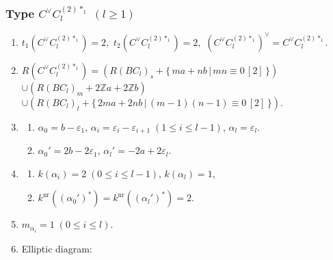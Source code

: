 \documentclass[11pt]{amsart}
\newcommand{\Z}{\mathbb{Z}}
\newcommand{\nr}{\mathrm{nr}}
\newcommand{\vep}{\varepsilon}
\begin{document}
{%
\subsubsection{Type $C^\vee C_l^{(2)\ast_{1}}$ $(l\geq 1)$}\label{data:CC-10}
\begin{enumerate}
\item $t_1(C^\vee C_l^{(2)\ast_{1}})=2,$ \quad $t_2(C^\vee C_l^{(2)\ast_{1}})=2,$ \quad $(C^\vee C_l^{(2)\ast_{1}})^\vee = C^\vee C_l^{(2)\ast_{1}}.$
\item $R(C^\vee C_l^{(2)\ast_{1}})=(R(BC_l)_s+\{ \,ma+nb\, \vert\, mn \equiv 0\, [2]\,\})$ \\
 $\cup (R(BC_l)_m+2\Z a+2\Z b)$ \\
 $\cup (R(BC_l)_l+\{ \,2ma+2nb\, \vert\, (m-1)(n-1) \equiv 0\, [2]\,\})$. 
\item 
\begin{enumerate}
\item[i)] $\alpha_0=b-\vep_1$, $\alpha_i=\vep_i-\vep_{i+1}\; 
(1\leq i \leq l-1)$, $\alpha_l=\vep_l$. 
\item[ii)] $\alpha_0'=2b-2\vep_1$, \; $\alpha_l'= -2a+2\vep_l$.
\end{enumerate}
\item 
\begin{enumerate}
\item[i)] $k(\alpha_i)=2\; (0\leq  i \leq l-1)$, \; $k(\alpha_l)=1$, 
\item[ii)] $k^{\nr}((\alpha_0')^\ast)=k^{\nr}((\alpha_l')^\ast)=2$. 
\end{enumerate}
\item $m_{\alpha_i}=1\; (0 \leq i \leq l)$. 
\item Elliptic diagram: 




\begin{center}
\end{center}
\end{enumerate}}
\end{document}
